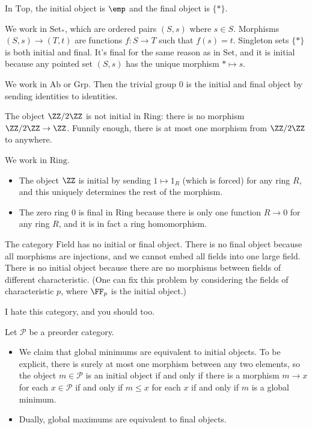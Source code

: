 \documentclass[../notes.tex]{subfiles}
\begin{document}
\begin{example}
	In $\mathrm{Top}$, the initial object is $\emp$ and the final object is $\{*\}$.
\end{example}
\begin{example}
	We work in $\mathrm{Set}_*$, which are ordered pairs $(S,s)$ where $s\in S$. Morphisms $(S,s)\to(T,t)$ are functions $f:S\to T$ such that $f(s)=t$. Singleton sets $\{*\}$ is both initial and final. It's final for the same reason as in $\mathrm{Set}$, and it is initial because any pointed set $(S,s)$ has the unique morphism $*\mapsto s$.
\end{example}
\begin{example}
	We work in $\mathrm{Ab}$ or $\mathrm{Grp}$. Then the trivial group $0$ is the initial and final object by sending identities to identities.
\end{example}
\begin{nex}
	The object $\ZZ/2\ZZ$ is not initial in $\mathrm{Ring}$: there is no morphism $\ZZ/2\ZZ\to\ZZ$. Funnily enough, there is at most one morphism from $\ZZ/2\ZZ$ to anywhere.
\end{nex}
\begin{nex}
	We work in $\mathrm{Ring}$.
	\begin{itemize}
		\item The object $\ZZ$ is initial by sending $1\mapsto1_R$ (which is forced) for any ring $R$, and this uniquely determines the rest of the morphism.
		\item The zero ring $0$ is final in $\mathrm{Ring}$ because there is only one function $R\to0$ for any ring $R$, and it is in fact a ring homomorphism.
	\end{itemize}
\end{nex}
\begin{example}
	The category $\mathrm{Field}$ has no initial or final object. There is no final object because all morphisms are injections, and we cannot embed all fields into one large field. There is no initial object because there are no morphisms between fields of different characteristic. (One can fix this problem by considering the fields of characteristic $p$, where $\FF_p$ is the initial object.)
\end{example}
\begin{quot}
	I hate this category, and you should too.
\end{quot}
\begin{example}
	Let $\mathcal P$ be a preorder category.
	\begin{itemize}
		\item We claim that global minimums are equivalent to initial objects. To be explicit, there is surely at most one morphism between any two elements, so the object $m\in\mathcal P$ is an initial object if and only if there is a morphism $m\to x$ for each $x\in\mathcal P$ if and only if $m\le x$ for each $x$ if and only if $m$ is a global minimum.
		\item Dually, global maximums are equivalent to final objects.
	\end{itemize}
\end{example}
\end{document}
